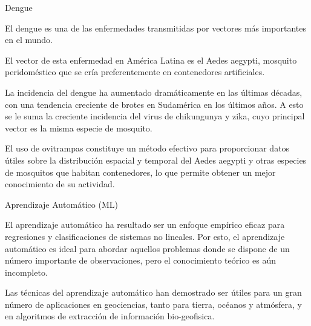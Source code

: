 \documentclass[10pt]{beamer}
\begin{document}
\begin{frame}{Dengue}

  El dengue es una de las enfermedades transmitidas por vectores más importantes
  en el mundo.

  El vector de esta enfermedad en América Latina es el Aedes aegypti, mosquito
  peridoméstico que se cría preferentemente en contenedores artificiales.

  La incidencia del dengue ha aumentado dramáticamente en las últimas décadas,
  con una tendencia creciente de brotes en Sudamérica en los últimos años. A
  esto se le suma la creciente incidencia del virus de chikungunya y zika, cuyo
  principal vector es la misma especie de mosquito.

  El uso de ovitrampas constituye un método efectivo para proporcionar datos
  útiles sobre la distribución espacial y temporal del Aedes aegypti y otras
  especies de mosquitos que habitan contenedores, lo que permite obtener un
  mejor conocimiento de su actividad.

\end{frame}

\begin{frame}{Aprendizaje Automático (ML)}

El aprendizaje automático ha resultado ser un enfoque empírico eficaz para
regresiones y clasificaciones de sistemas no lineales. Por esto, el aprendizaje
automático es ideal para abordar aquellos problemas donde se dispone de un
número importante de observaciones, pero el conocimiento teórico es aún
incompleto.

Las técnicas del aprendizaje automático han demostrado ser útiles para un gran
número de aplicaciones en geociencias, tanto para tierra, océanos y atmósfera, y
en algoritmos de extracción de información bio-geofisica.

\end{frame}
\end{document}

